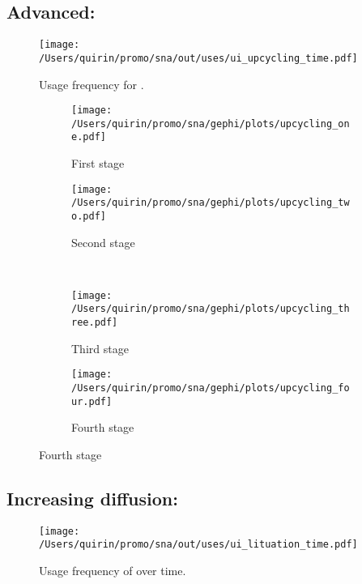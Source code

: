 \documentclass[
  a4paper,
  ]{scrartcl}
\begin{document}
  \subsection{Advanced: }

    \begin{figure}[H]
      \caption{Usage frequency for .}
      \centering
      \texttt{[image: /Users/quirin/promo/sna/out/uses/ui\_upcycling\_time.pdf]}
    \end{figure}

    \begin{figure}[H]
      \caption{Social network of diffusion for  over time.}
      \centering
      \begin{subfigure}{.45\linewidth}
        \caption{First stage}
        \centering
        \texttt{[image: /Users/quirin/promo/sna/gephi/plots/upcycling\_one.pdf]}
      \end{subfigure}
      \begin{subfigure}{.45\linewidth}
        \caption{Second stage}
        \centering
        \texttt{[image: /Users/quirin/promo/sna/gephi/plots/upcycling\_two.pdf]}
      \end{subfigure}\\
      \begin{subfigure}{.45\linewidth}
        \caption{Third stage}
        \centering
        \texttt{[image: /Users/quirin/promo/sna/gephi/plots/upcycling\_three.pdf]}
      \end{subfigure}
      \begin{subfigure}{.45\linewidth}
        \caption{Fourth stage}
        \centering
        \texttt{[image: /Users/quirin/promo/sna/gephi/plots/upcycling\_four.pdf]}
      \end{subfigure}
    \end{figure}

  \subsection{Increasing diffusion: }

    \begin{figure}[H]
      \caption{Usage frequency of  over time.}
      \centering
      \texttt{[image: /Users/quirin/promo/sna/out/uses/ui\_lituation\_time.pdf]}
    \end{figure}
\end{document}
